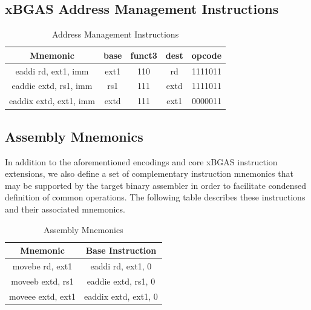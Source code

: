 \documentclass{article}
\begin{document}
\newpage
\subsection{xBGAS Address Management Instructions}

\begin{center}
\begin{small}

\begin{table}[H]
\caption{Address Management Instructions}
\begin{center}
\begin{tabular}{| c | c | c | c | c | }
\hline
Mnemonic & base & funct3 & dest & opcode \\ \hline
\hline
eaddi rd, ext1, imm & ext1 & 110 & rd & 1111011\\
\hline
eaddie extd, rs1, imm & rs1 &111 & extd & 1111011\\
\hline
eaddix extd, ext1, imm & extd & 111 & ext1 & 0000011\\
\hline
\end{tabular}
\end{center}
\end{table}

\end{small}
\end{center}

\subsection{Assembly Mnemonics}

In addition to the aforementioned encodings and core xBGAS 
instruction extensions, we also define a set of complementary 
instruction mnemonics that may be supported by the target 
binary assembler in order to facilitate condensed definition 
of common operations.  The following table describes 
these instructions and their associated mnemonics.  

\begin{center}
\begin{small}

\begin{table}[H]
\caption{Assembly Mnemonics}
\begin{center}
\begin{tabular}{| c | c |}
\hline
Mnemonic & Base Instruction\\ \hline
\hline
movebe rd, ext1 & eaddi rd, ext1, 0\\
\hline
moveeb extd, rs1 & eaddie extd, rs1, 0\\
\hline
moveee extd, ext1 & eaddix extd, ext1, 0\\
\hline
\end{tabular}
\end{center}
\end{table}

\end{small}
\end{center}
\end{document}

